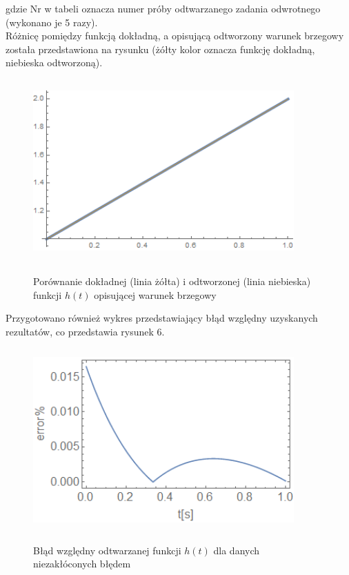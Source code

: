 \documentclass[twoside]{projektInzynierskiMS1}
\begin{document}
gdzie Nr w tabeli oznacza numer próby odtwarzanego zadania odwrotnego (wykonano je 5 razy). \\


Różnicę pomiędzy funkcją dokładną, a opisującą odtworzony warunek brzegowy została przedstawiona na rysunku (żółty kolor oznacza funkcję dokładną, niebieska odtworzoną).

\begin{figure}[H]
\begin{center}
		\includegraphics[height=7cm, width=10cm]{pics/0reconstruction.png}\\
	\caption{Porównanie dokładnej (linia żółta) i odtworzonej (linia niebieska) funkcji $h(t)$ opisującej warunek brzegowy}
\end{center}
\end{figure}

Przygotowano również wykres przedstawiający błąd względny uzyskanych rezultatów, co przedstawia rysunek 6. \\

\begin{figure}[H]
\begin{center}
		\includegraphics[height=7cm, width=10cm]{pics/0abs.png}\\
	\caption{Błąd względny odtwarzanej funkcji $h(t)$ dla danych niezakłóconych błędem}
\end{center}
\end{figure}
\end{document}
